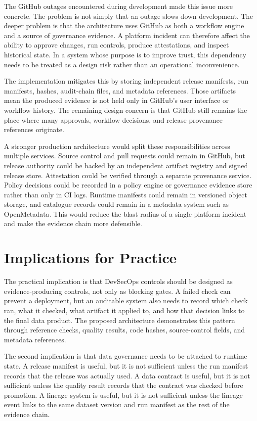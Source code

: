 The GitHub outages encountered during development made this issue more
concrete. The problem is not simply that an outage slows down development. The
deeper problem is that the architecture uses GitHub as both a workflow engine
and a source of governance evidence. A platform incident can therefore affect
the ability to approve changes, run controls, produce attestations, and inspect
historical state. In a system whose purpose is to improve trust, this
dependency needs to be treated as a design risk rather than an operational
inconvenience.

The implementation mitigates this by storing independent release
manifests, run manifests, hashes, audit-chain files, and metadata references.
Those artifacts mean the produced evidence is not held only in GitHub's user
interface or workflow history. The remaining design concern is that GitHub
still remains the place where many approvals, workflow decisions, and release
provenance references originate.

A stronger production architecture would split these responsibilities across
multiple services. Source control and pull requests could remain in GitHub, but
release authority could be backed by an independent artifact registry and
signed release store. Attestation could be verified through a separate
provenance service. Policy decisions could be recorded in a policy engine or
governance evidence store rather than only in CI logs. Runtime manifests could
remain in versioned object storage, and catalogue records could remain in a
metadata system such as OpenMetadata. This would reduce the blast radius of a
single platform incident and make the evidence chain more defensible.

\section{Implications for Practice}
\noindent
The practical implication is that DevSecOps controls should be designed as
evidence-producing controls, not only as blocking gates. A failed check can
prevent a deployment, but an auditable system also needs to record which check
ran, what it checked, what artifact it applied to, and how that decision links
to the final data product. The proposed architecture demonstrates this pattern
through reference checks, quality results, code hashes, source-control fields,
and metadata references.

The second implication is that data governance needs to be attached to runtime
state. A release manifest is useful, but it is not sufficient unless the run
manifest records that the release was actually used. A data contract is useful,
but it is not sufficient unless the quality result records that the contract was
checked before promotion. A lineage system is useful, but it is not sufficient
unless the lineage event links to the same dataset version and run manifest as
the rest of the evidence chain.

